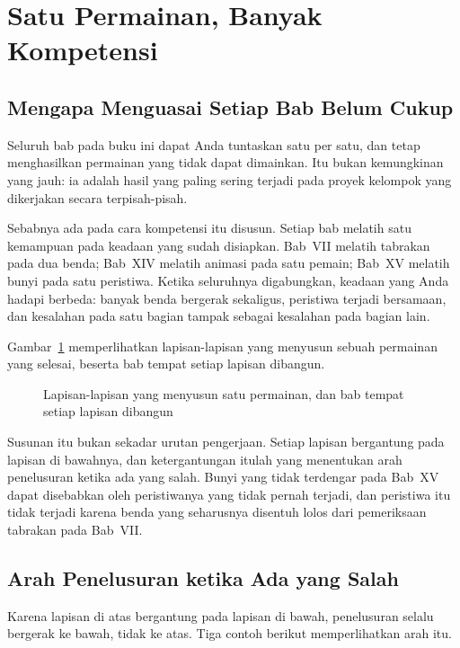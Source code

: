 \section{Satu Permainan, Banyak Kompetensi}
\label{sec:lapisan-kompetensi}

\subsection{Mengapa Menguasai Setiap Bab Belum Cukup}

Seluruh bab pada buku ini dapat Anda tuntaskan satu per satu, dan tetap
menghasilkan permainan yang tidak dapat dimainkan. Itu bukan kemungkinan yang
jauh: ia adalah hasil yang paling sering terjadi pada proyek kelompok yang
dikerjakan secara terpisah-pisah.

Sebabnya ada pada cara kompetensi itu disusun. Setiap bab melatih satu
kemampuan pada keadaan yang sudah disiapkan. Bab~VII melatih tabrakan pada dua
benda; Bab~XIV melatih animasi pada satu pemain; Bab~XV melatih bunyi pada satu
peristiwa. Ketika seluruhnya digabungkan, keadaan yang Anda hadapi berbeda:
banyak benda bergerak sekaligus, peristiwa terjadi bersamaan, dan kesalahan
pada satu bagian tampak sebagai kesalahan pada bagian lain.

Gambar~\ref{fig:lapisan-permainan} memperlihatkan lapisan-lapisan yang menyusun
sebuah permainan yang selesai, beserta bab tempat setiap lapisan dibangun.

\begin{figure}[htbp]
\centering

\caption{Lapisan-lapisan yang menyusun satu permainan, dan bab tempat setiap lapisan dibangun}
\label{fig:lapisan-permainan}
\end{figure}

Susunan itu bukan sekadar urutan pengerjaan. Setiap lapisan bergantung pada
lapisan di bawahnya, dan ketergantungan itulah yang menentukan arah penelusuran
ketika ada yang salah. Bunyi yang tidak terdengar pada Bab~XV dapat disebabkan
oleh peristiwanya yang tidak pernah terjadi, dan peristiwa itu tidak terjadi
karena benda yang seharusnya disentuh lolos dari pemeriksaan tabrakan pada
Bab~VII.

\subsection{Arah Penelusuran ketika Ada yang Salah}

Karena lapisan di atas bergantung pada lapisan di bawah, penelusuran selalu
bergerak ke bawah, tidak ke atas. Tiga contoh berikut memperlihatkan arah itu.

